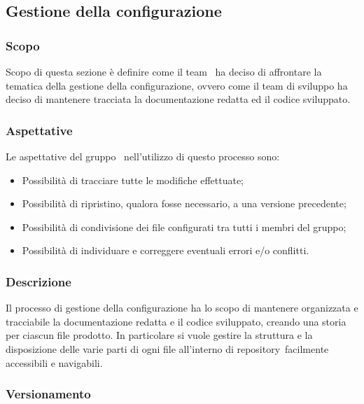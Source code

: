 \vspace{2cm}

\subsection{Gestione della configurazione}\label{subsection:gestione_configurazione}
    \subsubsection{Scopo}
    Scopo di questa sezione è definire come il team \groupName\ ha deciso di affrontare la tematica della gestione della configurazione, ovvero come il team di sviluppo ha deciso di mantenere tracciata la documentazione redatta ed il codice sviluppato.

    \subsubsection{Aspettative}
    Le aspettative del gruppo \groupName\ nell'utilizzo di questo processo sono:
    \begin{itemize}
        \item Possibilità di tracciare tutte le modifiche effettuate;
        \item Possibilità di ripristino, qualora fosse necessario, a una versione precedente;
        \item Possibilità di condivisione dei file configurati tra tutti i membri del gruppo;
        \item Possibilità di individuare e correggere eventuali errori e/o conflitti.
    \end{itemize}

    \subsubsection{Descrizione}
    Il processo di gestione della configurazione ha lo scopo di mantenere organizzata e tracciabile la documentazione redatta e il codice sviluppato, creando una storia per ciascun file prodotto.
    In particolare si vuole gestire la struttura e la disposizione delle varie parti di ogni file all'interno di repository\glo\ facilmente accessibili e navigabili.

    \subsubsection{Versionamento}
